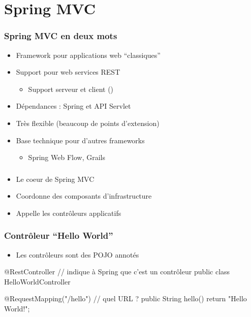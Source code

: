 \section{Spring MVC}


\begin{frame}
 \frametitle{Spring MVC en deux mots}
 \begin{itemize}
  \item Framework pour applications web ``classiques''
  \item Support pour web services REST
   \begin{itemize}
    \item Support serveur et client ()
   \end{itemize}
  \item Dépendances : Spring et API Servlet
  \item Très flexible (beaucoup de points d'extension)
  \item Base technique pour d'autres frameworks
  \begin{itemize}
   \item Spring Web Flow, Grails
  \end{itemize}
 \end{itemize}
\end{frame}

\begin{frame}
 \frametitle{}

 \begin{itemize}
  \item Le coeur de Spring MVC
  \item Coordonne des composants d'infrastructure
  \item Appelle les contrôleurs applicatifs
 \end{itemize}
\end{frame}


\begin{frame}[fragile]
 \frametitle{Contrôleur ``Hello World''}

  \begin{itemize}
   \item Les contrôleurs sont des POJO annotés
  \end{itemize}

 \begin{javacode}
@RestController // indique \`a Spring que c'est un contr\^oleur
public class HelloWorldController {

  @RequestMapping("/hello") // quel URL ?
  public String hello() {
    return "Hello World!";
  }

}
 \end{javacode}

\end{frame}

